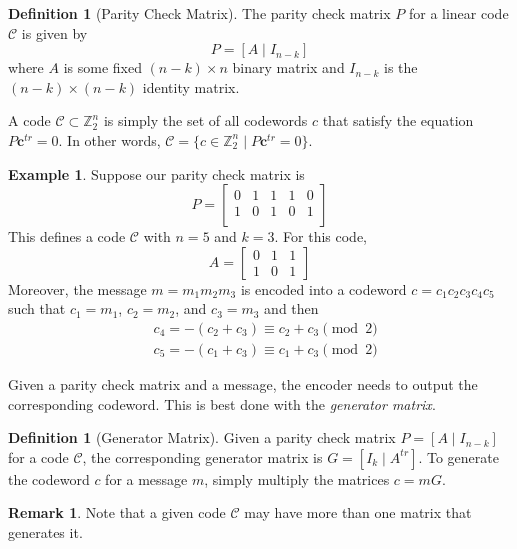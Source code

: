 \documentclass[12pt,twoside]{reedthesis}
\theoremstyle{definition}
\newtheorem{definition}[theorem]{Definition}
\newtheorem{example}[theorem]{Example}
\newtheorem{remark}[theorem]{Remark}
\newcommand{\Z}{\mathbb{Z}}
\begin{document}
\begin{definition}[Parity Check Matrix] The parity check matrix $P$ for a linear code $\mathscr{C}$ is given by 
\begin{equation*}
P = [A \mid I_{n-k}]
\end{equation*}
where $A$ is some fixed $(n-k) \times n$ binary matrix and $I_{n-k}$ is the $(n-k)\times(n-k)$ identity matrix.
\end{definition}
A code $\mathscr{C}\subset \Z_2^n$ is simply the set of all codewords $c$ that satisfy the equation $P\mathbf{c}^{tr} = 0$. In other words, $\mathscr{C} = \{c\in \Z_2^n \mid P\mathbf{c}^{tr} = 0\}$.
\begin{example} \label{P_ex} Suppose our parity check matrix is
\begin{equation*}
P = 
\left[
\begin{array}{ccc|cc}
0 & 1 & 1 & 1 & 0 \\
1 & 0 & 1 & 0 & 1\\
\end{array}
\right]
\end{equation*}
This defines a code $\mathscr{C}$ with $n = 5$ and $k = 3$. For this code,
\begin{equation*}
A = 
\begin{bmatrix}
0 & 1 & 1\\
1 & 0 & 1
\end{bmatrix}
\end{equation*}
Moreover, the message $m = m_1m_2m_3$ is encoded into a codeword $c = c_1 c_2 c_3 c_4 c_5$ such that $c_1 = m_1$, $c_2 = m_2$, and $c_3 = m_3$ and then
\begin{align*}
& c_4 = -(c_2 + c_3) \equiv c_2 + c_3 \pmod 2\\
& c_5 =  -(c_1 + c_3) \equiv c_1 + c_3 \pmod 2
\end{align*}
\end{example}

Given a parity check matrix and a message, the encoder needs to output the corresponding codeword. This is best done with the \textit{generator matrix}.

\begin{definition}[Generator Matrix] Given a parity check matrix $P = [A\mid I_{n-k}]$ for a code $\mathscr{C}$, the corresponding generator matrix is $G = [I_k \mid A^{tr}]$.
To generate the codeword $c$ for a message $m$, simply multiply the matrices $c = mG$.
\end{definition}

\begin{remark}
Note that a given code $\mathscr{C}$ may have more than one matrix that generates it.
\end{remark}
\end{document}
